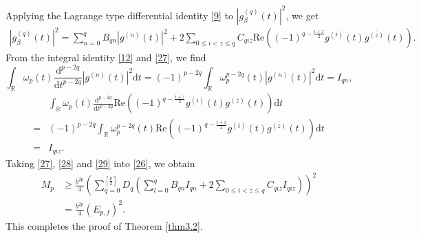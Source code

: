 \documentclass[preprint,12pt]{elsarticle}
\begin{document}
Applying the Lagrange type differential identity \eqref{9} to $\left| g_{\beta}^{(q)} (t) \right|^2$, we get
\begin{equation}
\begin{aligned}
\label{27}
\left| g_{\beta}^{(q)} (t) \right|^2= \sum_{n=0}^q B_{qn} \left|g^{(n)}(t) \right|^2 +2 \sum_{0 \leq i< z \leq q} C_{qiz} \mathrm{Re}((-1)^{q-\frac{i+z}{2}} g^{(i)}(t) g^{\overline{(z)}}(t)).
\end{aligned}
\end{equation}
From the integral identity \eqref{12} and \eqref{27}, we find
\begin{equation}
\label{28}
\int_{\mathbb{R}} \omega_p(t) \frac{\mathrm{d}^{p-2q}}{\mathrm{d}t^{p-2q}} \left|g^{(n)}(t) \right|^2 \mathrm{d}t = (-1)^{p-2q} \int_{\mathbb{R}}\omega_p^{p-2q}(t) \left|g^{(n)}(t) \right|^2 \mathrm{d}t = I_{qn},
\end{equation}
\begin{equation}
\begin{aligned}
\label{29}
&\int_{\mathbb{R}} \omega_p(t) \frac{\mathrm{d}^{p-2q}}{\mathrm{d}t^{p-2q}} \mathrm{Re}((-1)^{q-\frac{i+z}{2}} g^{(i)}(t) g^{\overline{(z)}}(t)) \mathrm{d}t \\
= &(-1)^{p-2q} \int_{\mathbb{R}}\omega_p^{p-2q}(t) \mathrm{Re}((-1)^{q-\frac{i+z}{2}} g^{(i)}(t) g^{\overline{(z)}}(t)) \mathrm{d}t \\
= &I_{qiz}.
\end{aligned}
\end{equation}
Taking \eqref{27}, \eqref{28} and \eqref{29} into \eqref{26}, we obtain
\begin{equation}
\begin{aligned}
\label{80}
M_p &\ge \frac{b^{2p}}{4} \left( \sum_{q=0}^{\left[ \frac{p}{2} \right]} D_q \left( \sum_{l=0}^q B_{qn} I_{qn} +2 \sum_{0 \leq i< z \leq q} C_{qiz} I_{qiz} \right) \right)^2 \\
&=\frac{b^{2p}}{4} \left( E_{p,f} \right)^2.
\end{aligned}
\end{equation}
This completes the proof of Theorem \ref{thm3.2}.
\end{document}

